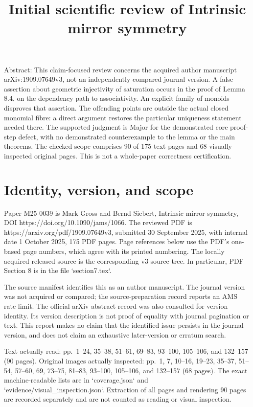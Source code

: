 \documentclass[10pt]{article}
\title{Initial scientific review of Intrinsic mirror symmetry}
\author{}
\date{}
\begin{document}
\maketitle
Abstract: This claim-focused review concerns the acquired author manuscript arXiv:1909.07649v3, not an independently compared journal version. A false assertion about geometric injectivity of saturation occurs in the proof of Lemma 8.4, on the dependency path to associativity. An explicit family of monoids disproves that assertion. The offending points are outside the actual closed monomial fibre: a direct argument restores the particular uniqueness statement needed there. The supported judgment is Major for the demonstrated core proof-step defect, with no demonstrated counterexample to the lemma or the main theorems. The checked scope comprises 90 of 175 text pages and 68 visually inspected original pages. This is not a whole-paper correctness certification.\par
\section*{Identity, version, and scope}
Paper M25-0039 is Mark Gross and Bernd Siebert, Intrinsic mirror symmetry, DOI https://doi.org/10.1090/jams/1066. The reviewed PDF is https://arxiv.org/pdf/1909.07649v3, submitted 30 September 2025, with internal date 1 October 2025, 175 PDF pages. Page references below use the PDF’s one-based page numbers, which agree with its printed numbering. The locally acquired released source is the corresponding v3 source tree. In particular, PDF Section 8 is in the file `section7.tex`.\par
The source manifest identifies this as an author manuscript. The journal version was not acquired or compared; the source-preparation record reports an AMS rate limit. The official arXiv abstract record was also consulted for version identity. Its version description is not proof of equality with journal pagination or text. This report makes no claim that the identified issue persists in the journal version, and does not claim an exhaustive later-version or erratum search.\par
Text actually read: pp. 1–24, 35–38, 51–61, 69–83, 93–100, 105–106, and 132–157 (90 pages). Original images actually inspected: pp. 1, 7, 10–16, 19–23, 35–37, 51–54, 57–60, 69, 73–75, 81–83, 93–100, 105–106, and 132–157 (68 pages). The exact machine-readable lists are in `coverage.json` and `evidence/visual\_inspection.json`. Extraction of all pages and rendering 90 pages are recorded separately and are not counted as reading or visual inspection.\par
\end{document}
